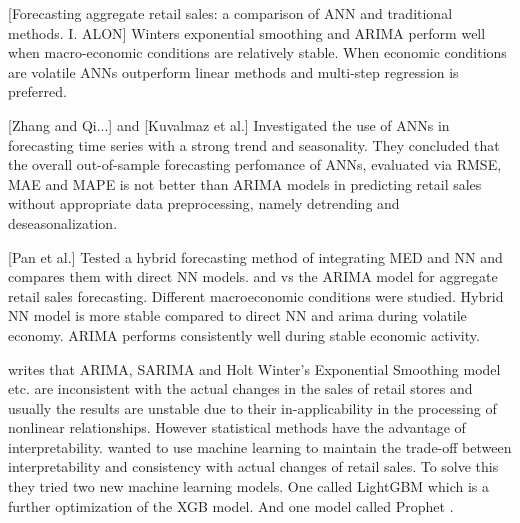 [Forecasting aggregate retail sales: a comparison of ANN and traditional methods. I. ALON]
Winters exponential smoothing and ARIMA perform well when macro-economic
conditions are relatively stable. When economic conditions are volatile
ANNs outperform linear methods and multi-step regression is preferred.

[Zhang and Qi...] and [Kuvalmaz et al.]
Investigated the use of ANNs in forecasting time series with a strong trend and seasonality.
They concluded that the overall out-of-sample forecasting perfomance of ANNs, 
evaluated via RMSE, MAE and MAPE is not better than ARIMA models in predicting
retail sales without appropriate data preprocessing,
namely detrending and deseasonalization.

[Pan et al.]
Tested a hybrid forecasting method of integrating MED and NN and compares them with direct NN models.
and vs the ARIMA model for aggregate retail sales forecasting.
Different macroeconomic conditions were studied.
Hybrid NN model is more stable compared to direct NN and arima during volatile economy.
ARIMA performs consistently well during stable economic activity.


\cite{Weng2020} writes that ARIMA, SARIMA and Holt Winter's
Exponential Smoothing model etc. are inconsistent with the actual changes in the sales
of retail stores and usually the results are unstable due to their in-applicability
in the processing of nonlinear relationships.
However statistical methods have the advantage of interpretability.
\cite{Bowen2020} wanted to use machine learning to maintain
the trade-off between interpretability and consistency with actual
changes of retail sales.
To solve this they tried two new machine learning models.
One called LightGBM which is a further optimization of the XGB model.
And one model called Prophet \citep{Zunic2020}.

